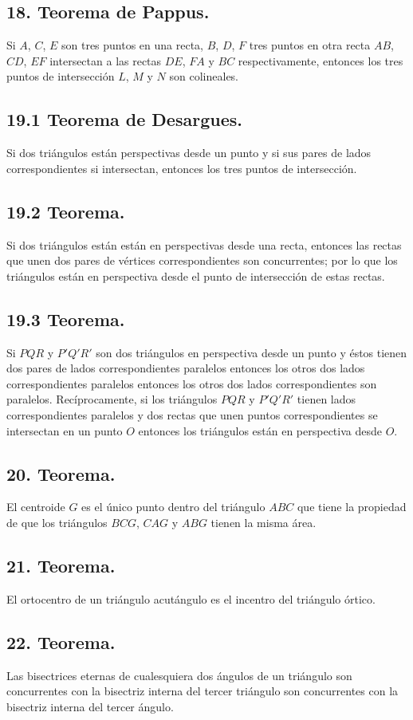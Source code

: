 \documentclass[12pt,a4paper]{article}
\begin{document}
\subsection*{18. Teorema de Pappus.}
Si $A$, $C$, $E$ son tres puntos en una recta, $B$, $D$, $F$ tres puntos en otra recta $AB$, $CD$, $EF$ intersectan a las rectas $DE$, $FA$ y $BC$ respectivamente, entonces los tres puntos de intersección $L$, $M$ y $N$ son colineales.
\subsection*{19.1 Teorema de Desargues.}
Si dos triángulos están perspectivas desde un punto y si sus pares de lados correspondientes si intersectan, entonces los tres puntos de intersección.
\subsection*{19.2 Teorema.}
Si dos triángulos están están en perspectivas desde una recta, entonces las rectas que unen dos pares de vértices correspondientes son concurrentes; por lo que los triángulos están en perspectiva desde el punto de intersección de estas rectas.
\subsection*{19.3 Teorema.}
Si $PQR$ y $P'Q'R'$ son dos triángulos  en perspectiva desde un punto y éstos tienen dos pares de lados correspondientes paralelos entonces los otros dos lados correspondientes paralelos entonces los otros dos lados correspondientes son paralelos. Recíprocamente, si los triángulos $PQR$ y $P'Q'R'$ tienen lados correspondientes paralelos y dos rectas que unen puntos correspondientes se intersectan en un punto $O$ entonces los triángulos están en perspectiva desde $O$.
\subsection*{20. Teorema.}
El centroide $G$ es el único punto dentro del triángulo $ABC$ que tiene la propiedad de que los triángulos $BCG$, $CAG$ y $ABG$ tienen la misma área.
\subsection*{21. Teorema.}
El ortocentro de un triángulo acutángulo es el incentro del triángulo órtico.
\subsection*{22. Teorema.}
Las bisectrices eternas de cualesquiera dos ángulos de un triángulo son concurrentes con la bisectriz interna del tercer triángulo son concurrentes con la bisectriz interna del tercer ángulo.
\end{document}
